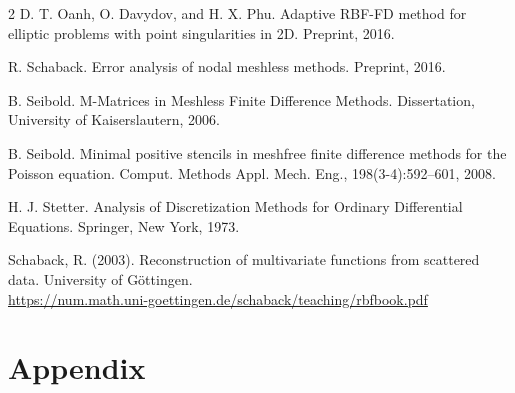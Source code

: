 \documentclass[11pt]{article}
\begin{document}
\begin{thebibliography}{2}
D. T. Oanh, O. Davydov, and H. X. Phu. Adaptive RBF-FD method for elliptic
problems with point singularities in 2D. Preprint, 2016.

R. Schaback. Error analysis of nodal meshless methods. Preprint, 2016.

B. Seibold. M-Matrices in Meshless Finite Difference Methods. Dissertation, University of Kaiserslautern, 2006.

B. Seibold. Minimal positive stencils in meshfree finite difference methods for the
Poisson equation. Comput. Methods Appl. Mech. Eng., 198(3-4):592–601, 2008.

H. J. Stetter. Analysis of Discretization Methods for Ordinary Differential Equations. Springer, New York, 1973.

Schaback, R. (2003). Reconstruction of multivariate functions from scattered data.
University of Göttingen. \\ \url{https://num.math.uni-goettingen.de/schaback/teaching/rbfbook.pdf}

\end{thebibliography}

\pagebreak

\section{Appendix}
\end{document}
